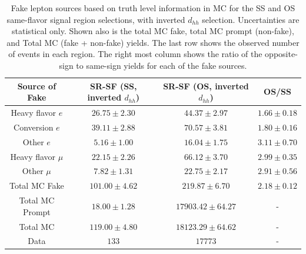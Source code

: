 \begin{table}[!htb]
    \begin{center}
    \caption{
        Fake lepton sources based on truth level information in MC for the SS and OS same-flavor signal region selections,
        with inverted $d_{hh}$ selection. Uncertainties are statistical only.
        Shown also is the
        total MC fake, total MC prompt (non-fake), and Total MC (fake + non-fake) yields. The last row
        shows the observed number of events in each region. The right most column shows the
        ratio of the opposite-sign to same-sign yields for each of the fake sources.
    }
    \label{tab:fake_composition_srsf}
    \begin{tabular}{c | c c | c}
    \hline
    \textbf{Source of Fake} & \textbf{SR-SF (SS, inverted $d_{hh}$)} & \textbf{SR-SF (OS, inverted $d_{hh}$)} & \textbf{OS/SS} \\ 
    \hline
    Heavy flavor $e$ & $26.75 \pm 2.30$ & $44.37 \pm 2.97$ & $1.66 \pm 0.18$ \\
    Conversion $e$ & $39.11 \pm 2.88$ & $70.57 \pm 3.81$ & $1.80 \pm 0.16$ \\
    Other $e$ & $5.16 \pm 1.00$ & $16.04 \pm 1.75$ & $3.11 \pm 0.70$  \\
    Heavy flavor $\mu$ & $22.15 \pm 2.26$ & $66.12 \pm 3.70$ & $2.99 \pm 0.35$ \\
    Other $\mu$ & $7.82 \pm 1.31$ & $22.75 \pm 2.17$ & $2.91 \pm 0.56$ \\
    \hdashline
    Total MC Fake & $101.00 \pm 4.62$ & $219.87 \pm 6.70$ & $2.18 \pm 0.12$ \\
    Total MC Prompt & $18.00 \pm 1.28$ & $17903.42 \pm 64.27$ & - \\
    \hline
    Total MC & $119.00 \pm 4.80$ & $18123.29 \pm  64.62$ & - \\
    Data & $133$ & $17773$ & - \\
    \hline
    \end{tabular}
    \end{center}
\end{table}

